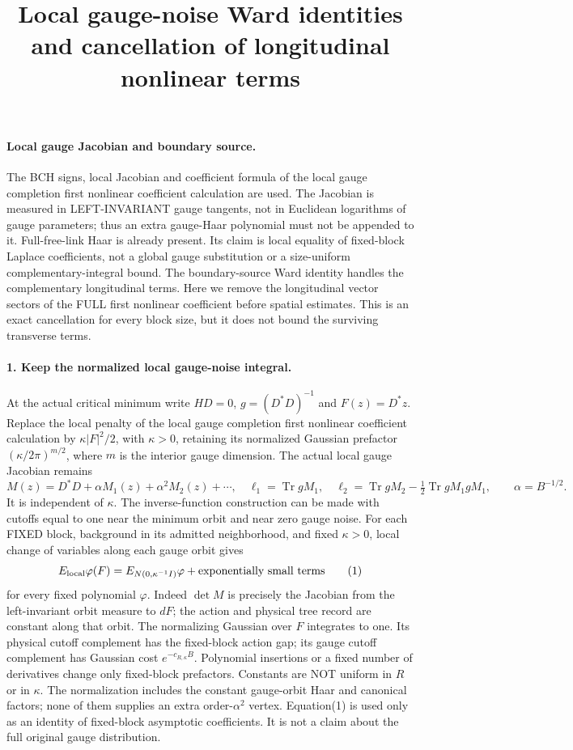 \documentclass[11pt]{article}
\title{Local gauge-noise Ward identities and cancellation of longitudinal nonlinear terms}\author{}\date{}
\begin{document}
\maketitle
\paragraph{Local gauge Jacobian and boundary source.}
The BCH signs, local Jacobian and coefficient formula of the local gauge completion first nonlinear coefficient calculation are used. The
Jacobian is measured in LEFT-INVARIANT gauge tangents, not in Euclidean
logarithms of gauge parameters; thus an extra gauge-Haar polynomial must
not be appended to it. Full-free-link Haar is already present. Its claim
is local equality of fixed-block Laplace coefficients, not a global gauge
substitution or a size-uniform complementary-integral bound.
The boundary-source Ward identity handles the complementary longitudinal terms.
Here we remove the longitudinal vector sectors of the FULL first nonlinear
coefficient before spatial estimates. This is an exact cancellation for
every block size, but it does not bound the surviving transverse terms.

\paragraph{1. Keep the normalized local gauge-noise integral.}
At the actual critical minimum write $H D=0$, $g=(D^*D)^{-1}$ and
$F(z)=D^*z$. Replace the local penalty of the local gauge completion first nonlinear coefficient calculation by
$\kappa |F|^2/2$, with $\kappa>0$, retaining its normalized Gaussian
prefactor $(\kappa/2\pi)^{m/2}$, where $m$ is the interior gauge dimension.
The actual local gauge Jacobian remains
\[
 M(z)=D^*D+\alpha M_1(z)+\alpha^2M_2(z)+\cdots,\quad
 \ell_1=\operatorname{Tr}gM_1,\quad
 \ell_2=\operatorname{Tr}gM_2-\tfrac12\operatorname{Tr}gM_1gM_1,
 \qquad\alpha=B^{-1/2}.
\]
It is independent of $\kappa$. The inverse-function construction can be
made with cutoffs equal to one near the minimum orbit and near zero gauge
noise. For each FIXED block, background in its admitted neighborhood, and
fixed $\kappa>0$, local change of variables along each gauge orbit gives
\[
 E_{\rm local}\varphi(F)
   = E_{N(0,\kappa^{-1}I)}\varphi+\text{exponentially small terms}   \tag{1}
\]
for every fixed polynomial $\varphi$. Indeed $\det M$ is precisely the
Jacobian from the left-invariant orbit measure to $dF$; the action and
physical tree record are constant along that orbit. The normalizing
Gaussian over $F$ integrates to one. Its physical cutoff complement has
the fixed-block action gap; its gauge cutoff complement has Gaussian cost
$e^{-c_{R,\kappa}B}$. Polynomial insertions or a fixed number of derivatives
change only fixed-block prefactors. Constants are NOT uniform in $R$ or
in $\kappa$. The normalization includes the constant gauge-orbit Haar and
canonical factors; none of them supplies an extra order-$\alpha^2$ vertex.
Equation(1) is used only as an identity of fixed-block asymptotic
coefficients. It is not a claim about the full original gauge distribution.
\end{document}
